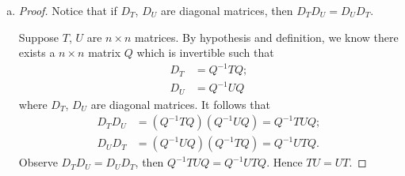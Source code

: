 \begin{Exercise}
\begin{enumerate}[(a)]
\item
\begin{proof}
Notice that if $D_T$, $D_U$ are diagonal matrices, then $D_T D_U = D_U D_T$.

Suppose $T$, $U$ are $n\times n$ matrices. By hypothesis and definition, we know there exists a $n\times n$ matrix $Q$ which is invertible such that
\begin{align*}
D_T &= Q^{-1} T Q; \\
D_U &= Q^{-1} U Q
\end{align*}
where $D_T$, $D_U$ are diagonal matrices. It follows that 
\begin{align*}
D_T D_U &= (Q^{-1} T Q) (Q^{-1} U Q) = Q^{-1} T U Q; \\
D_U D_T &= (Q^{-1} U Q) (Q^{-1} T Q) = Q^{-1} U T Q.
\end{align*}
Observe $D_T D_U = D_U D_T$, then $Q^{-1} T U Q = Q^{-1} U T Q$. Hence $T U = U T$.
\end{proof}
\end{enumerate}
\end{Exercise}
